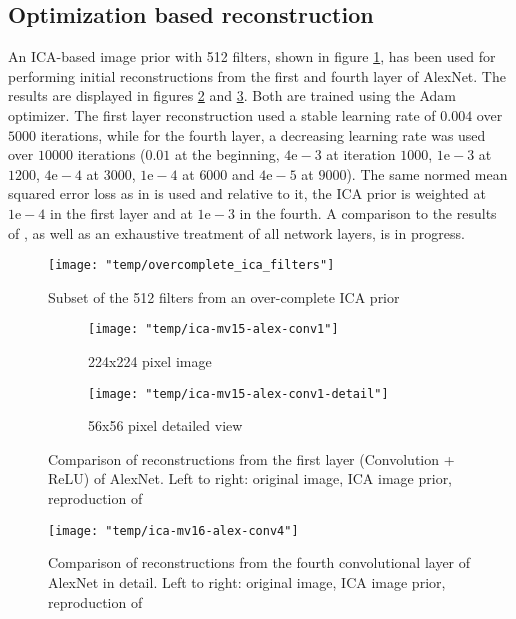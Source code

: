 \documentclass{article}
\begin{document}
\subsection{Optimization based reconstruction}

An ICA-based image prior with 512 filters, shown in figure \ref{fig:first_ica_filters}, has been used for performing initial reconstructions from the first and fourth layer of AlexNet. The results are displayed in figures \ref{fig:ica_mv_l1} and \ref{fig:ica_mv_l4}. Both are trained using the Adam optimizer. The first layer reconstruction used a stable learning rate of $0.004$ over $5000$ iterations, while for the fourth layer, a decreasing learning rate was used over $10000$ iterations ($0.01$ at the beginning, $4\mathrm{e-}3$ at iteration $1000$, $1\mathrm{e-}3$ at $1200$, $4\mathrm{e-}4$ at $3000$, $1\mathrm{e-}4$ at $6000$ and $4\mathrm{e-}5$ at $9000$). The same normed mean squared error loss as in \cite{mv15} is used and relative to it, the ICA prior is weighted at $1\mathrm{e-}4$ in the first layer and at $1\mathrm{e-}3$ in the fourth. A comparison to the results of \cite{mv16}, as well as an exhaustive treatment of all network layers, is in progress.

\begin{figure}
	\centering
	\texttt{[image: "temp/overcomplete\_ica\_filters"]}
	\caption{Subset of the 512 filters from an over-complete ICA prior}
	\label{fig:first_ica_filters}
\end{figure}


\begin{figure}
	\centering
	\begin{subfigure}[b]{\textwidth}
		\centering
		\texttt{[image: "temp/ica-mv15-alex-conv1"]}
		\caption{224x224 pixel image}
	\end{subfigure}
	
	\begin{subfigure}[b]{\textwidth}
		\centering
		\texttt{[image: "temp/ica-mv15-alex-conv1-detail"]}
		\caption{56x56 pixel detailed view}
	\end{subfigure}
	\caption{Comparison of reconstructions from the first layer (Convolution + ReLU) of AlexNet. Left to right: original image, ICA image prior, reproduction of \cite{mv15}}
	\label{fig:ica_mv_l1}
\end{figure}

\begin{figure}
	\centering
	\texttt{[image: "temp/ica-mv16-alex-conv4"]}
	\caption{Comparison of reconstructions from the fourth convolutional layer of AlexNet in detail. Left to right: original image, ICA image prior, reproduction of \cite{mv15}}
	\label{fig:ica_mv_l4}
\end{figure}
\end{document}

